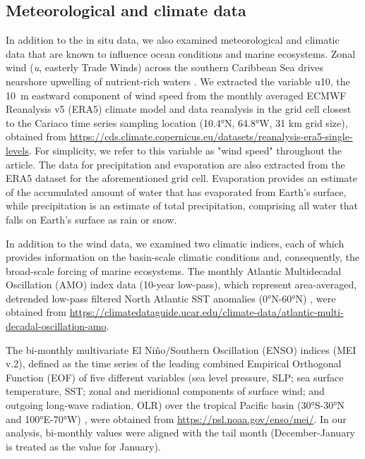 \documentclass[draft]{agujournal2019}
\begin{document}
\subsection{Meteorological and climate data}
    In addition to the in situ data, we also examined meteorological and climatic data that are known to influence ocean conditions and marine ecosystems. Zonal wind (\textit{u}, easterly Trade Winds) across the southern Caribbean Sea drives nearshore upwelling of nutrient-rich waters \cite{rueda-roa_southern_2013}. We extracted the variable u10, the \qty{10}{\meter} eastward component of wind speed from the monthly averaged ECMWF Reanalysis v5 (ERA5) climate model and data reanalysis \cite{hersbach2023era5} in the grid cell closest to the Cariaco time series sampling location (\ang{10.4}N, \ang{64.8}W, 31 km grid size), obtained from \url{https://cds.climate.copernicus.eu/datasets/reanalysis-era5-single-levels}. For simplicity, we refer to this variable as "wind speed" throughout the article. The data for precipitation and evaporation are also extracted from the ERA5 dataset for the aforementioned grid cell. Evaporation provides an estimate of the accumulated amount of water that has evaporated from Earth's surface, while precipitation is an estimate of total precipitation, comprising all water that falls on Earth's surface as rain or snow. 
    
    In addition to the wind data, we examined two climatic indices, each of which provides information on the basin-scale climatic conditions and, consequently, the broad-scale forcing of marine ecosystems. The monthly Atlantic Multidecadal Oscillation (AMO) index data (10-year low-pass), which represent area-averaged, detrended low-pass filtered North Atlantic SST anomalies (\ang{0}N-\ang{60}N) \cite{trenberth2023amo}, were obtained from \url{https://climatedataguide.ucar.edu/climate-data/atlantic-multi-decadal-oscillation-amo}. 
    
    The bi-monthly multivariate El Niño/Southern Oscillation (ENSO) indices (MEI v.2), defined as the time series of the leading combined Empirical Orthogonal Function (EOF) of five different variables (sea level pressure, SLP; sea surface temperature, SST; zonal and meridional components of surface wind; and outgoing long-wave radiation, OLR) over the tropical Pacific basin (\ang{30}S-\ang{30}N and \ang{100}E-\ang{70}W) \cite{noaa_psl_meiv2}, were obtained from \url{https://psl.noaa.gov/enso/mei/}. In our analysis, bi-monthly values were aligned with the tail month (December-January is treated as the value for January).
    
\end{document}
